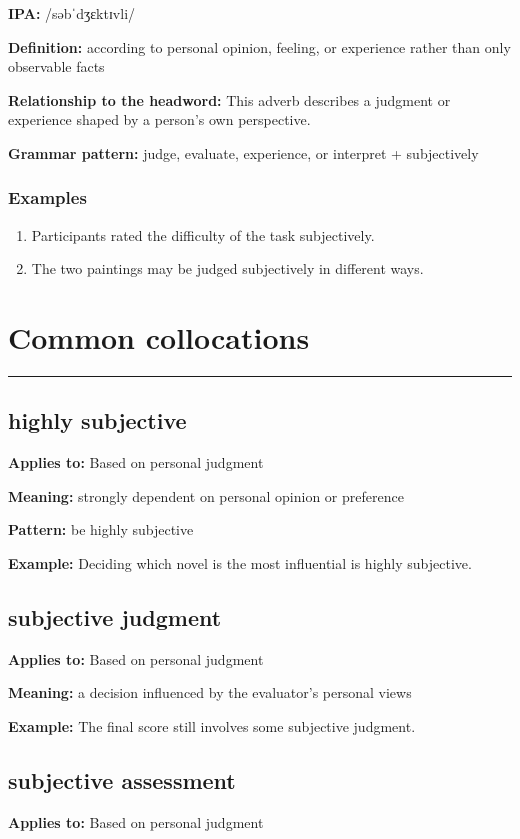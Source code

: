 \documentclass[11pt]{article}
\newcommand{\sectionrule}{\par\vspace{-0.5em}\noindent\textcolor{Accent}{\rule{\linewidth}{0.6pt}}\par}
\begin{document}
\textbf{IPA:} /səbˈdʒɛktɪvli/

\textbf{Definition:} according to personal opinion, feeling, or experience rather than only observable facts

\textbf{Relationship to the headword:} This adverb describes a judgment or experience shaped by a person's own perspective.

\textbf{Grammar pattern:} judge, evaluate, experience, or interpret + subjectively

\subsubsection{Examples}
\begin{enumerate}
  \item Participants rated the difficulty of the task subjectively.
  \item The two paintings may be judged subjectively in different ways.
\end{enumerate}

\section{Common collocations}
\sectionrule
\subsection{highly subjective}
\textbf{Applies to:} Based on personal judgment

\textbf{Meaning:} strongly dependent on personal opinion or preference

\textbf{Pattern:} be highly subjective

\textbf{Example:} Deciding which novel is the most influential is highly subjective.

\subsection{subjective judgment}
\textbf{Applies to:} Based on personal judgment

\textbf{Meaning:} a decision influenced by the evaluator's personal views

\textbf{Example:} The final score still involves some subjective judgment.

\subsection{subjective assessment}
\textbf{Applies to:} Based on personal judgment
\end{document}
